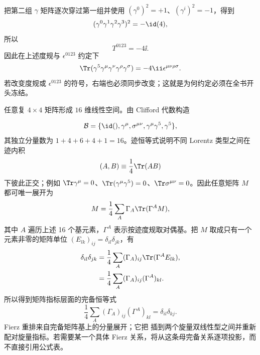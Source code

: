 \begin{derivation}
\begin{align*}
\end{align*}
把第二组 $\gamma$ 矩阵逐次穿过第一组并使用
$(\gamma^0)^2=+1$、$(\gamma^i)^2=-1$，得到
\begin{equation*}
 (\gamma^0\gamma^1\gamma^2\gamma^3)^2=-\id(4),
\end{equation*}
所以
\begin{equation*}
 T^{0123}=-4\ii.
\end{equation*}
因此在上述度规与 $\epsilon^{0123}$ 约定下
\begin{equation*}
 {
 \Tr(\gamma^5\gamma^\mu\gamma^\nu\gamma^\rho\gamma^\sigma)
 =-4\ii\epsilon^{\mu\nu\rho\sigma}.}
 \end{equation*}
若改变度规或 $\epsilon^{0123}$ 的符号，右端也必须同步改变；这就是为何约定必须在全书开头冻结。
\end{derivation}

\begin{derivation}
任意复 $4\times4$ 矩阵形成 $16$ 维线性空间。由 Clifford 代数构造

\begin{equation*}
 \mathcal B=
 \{\id(),\gamma^\mu,\sigma^{\mu\nu},\gamma^\mu\gamma^5,\gamma^5\},
 \end{equation*}
其独立分量数为
$1+4+6+4+1=16$。迹恒等式说明不同 Lorentz 类型之间在迹内积
\begin{equation*}
 (A,B)\equiv\frac14\Tr(AB)
\end{equation*}
下彼此正交；例如 $\Tr\gamma^\mu=0$、$\Tr(\gamma^\mu\gamma^5)=0$、$\Tr\sigma^{\mu\nu}=0$。因此任意矩阵 $M$ 都可唯一展开为
\begin{equation*}
 M=\frac14\sum_A \Gamma_A\Tr(\Gamma^A M),
 \end{equation*}
其中 $A$ 遍历上述 16 个基元素，$\Gamma^A$ 表示按迹度规取对偶基。把 $M$ 取成只有一个元素非零的矩阵单位 $(E_{lk})_{ij}=\delta_{il}\delta_{jk}$，有
\begin{align*}
 \delta_{il}\delta_{jk}
 &=\frac14\sum_A(\Gamma_A)_{ij}
 \Tr(\Gamma^A E_{lk}),\\
 &=\frac14\sum_A(\Gamma_A)_{ij}(\Gamma^A)_{kl}.
\end{align*}
所以得到矩阵指标层面的完备恒等式
\begin{equation*}
 {
 \frac14\sum_A
 (\Gamma_A)_{ij}(\Gamma^A)_{kl}
 =\delta_{il}\delta_{kj}.}
 \end{equation*}
Fierz 重排来自完备矩阵基上的分量展开；它把
插到两个旋量双线性型之间并重新配对旋量指标。若需要某一个具体 Fierz 关系，将从这条母完备关系逐项投影，而不直接引用公式表。
\end{derivation}



